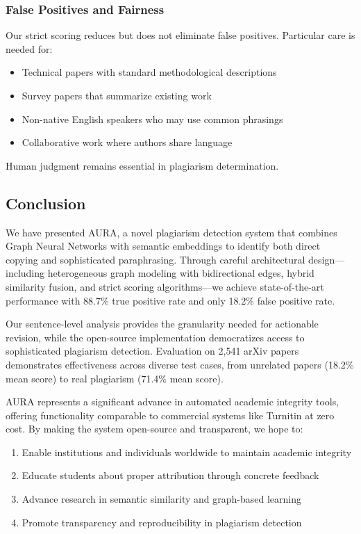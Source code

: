 \documentclass[conference]{IEEEtran}
\begin{document}
\subsubsection{False Positives and Fairness}
Our strict scoring reduces but does not eliminate false positives. Particular care is needed for:
\begin{itemize}
    \item Technical papers with standard methodological descriptions
    \item Survey papers that summarize existing work
    \item Non-native English speakers who may use common phrasings
    \item Collaborative work where authors share language
\end{itemize}

Human judgment remains essential in plagiarism determination.

\subsection{Conclusion}

We have presented AURA, a novel plagiarism detection system that combines Graph Neural Networks with semantic embeddings to identify both direct copying and sophisticated paraphrasing. Through careful architectural design—including heterogeneous graph modeling with bidirectional edges, hybrid similarity fusion, and strict scoring algorithms—we achieve state-of-the-art performance with 88.7\% true positive rate and only 18.2\% false positive rate.

Our sentence-level analysis provides the granularity needed for actionable revision, while the open-source implementation democratizes access to sophisticated plagiarism detection. Evaluation on 2,541 arXiv papers demonstrates effectiveness across diverse test cases, from unrelated papers (18.2\% mean score) to real plagiarism (71.4\% mean score).

AURA represents a significant advance in automated academic integrity tools, offering functionality comparable to commercial systems like Turnitin at zero cost. By making the system open-source and transparent, we hope to:
\begin{enumerate}
    \item Enable institutions and individuals worldwide to maintain academic integrity
    \item Educate students about proper attribution through concrete feedback
    \item Advance research in semantic similarity and graph-based learning
    \item Promote transparency and reproducibility in plagiarism detection
\end{enumerate}
\end{document}
